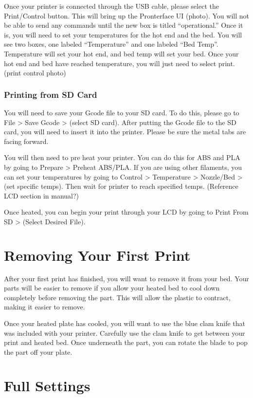 Once your printer is connected through the USB cable, please select the Print/Control button. This will bring up the Pronterface UI (photo). You will not be able to send any commands until the new box is titled “operational.” Once it is, you will need to set your temperatures for the hot end and the bed. You will see two boxes, one labeled “Temperature” and one labeled “Bed Temp”. Temperature will set your hot end, and bed temp will set your bed. Once your hot end and bed have reached temperature, you will just need to select print. (print control photo)

\subsubsection{Printing from SD Card}

You will need to save your Gcode file to your SD card. To do this, please go to File > Save Gcode > (select SD card). After putting the Gcode file to the SD card, you will need to insert it into the printer. Please be sure the metal tabs are facing forward. 

You will then need to pre heat your printer. You can do this for ABS and PLA by going to Prepare > Preheat ABS/PLA. If you are using other filaments, you can set your temperatures by going to Control > Temperature > Nozzle/Bed > (set specific temps). Then wait for printer to reach specified temps. (Reference LCD section in manual?)

Once heated, you can begin your print through your LCD by going to Print From SD > (Select Desired File).

\section{Removing Your First Print}

After your first print has finished, you will want to remove it from your bed. Your parts will be easier to remove if you allow your heated bed to cool down completely before removing the part. This will allow the plastic to contract, making it easier to remove.

Once your heated plate has cooled, you will want to use the blue clam knife that was included with your printer. Carefully use the clam knife to get between your print and heated bed. Once underneath the part, you can rotate the blade to pop the part off your plate.

\section{Full Settings}

